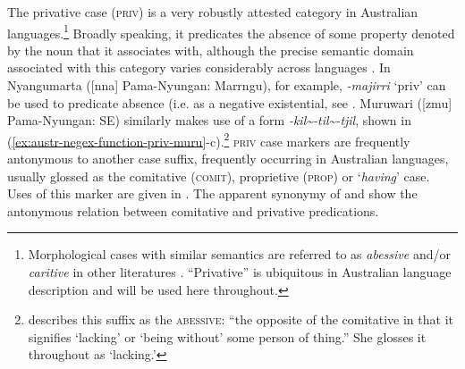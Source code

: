 \documentclass[output=paper]{langsci/langscibook}
\begin{document}
The privative case (\textsc{priv}) is a very robustly attested category in
Australian languages.\footnote{Morphological cases with similar
semantics are referred to as \textit{abessive} and\slash or \textit{caritive}
in other literatures \citep[e.g. for Uralic
in][]{Hamari2011-austr,Hamari2015,Tamm2015}. ``Privative'' is ubiquitous in
Australian language description and will be used here throughout.}
Broadly speaking, it predicates the absence of some property denoted by
the noun that it associates with, although the precise semantic domain
associated with this category varies considerably across languages
\citep[cf. arguments for the predicative status of negative
existential markers in ][139]{Veselinova2013}. In Nyangumarta
([nna] Pama-Nyungan: Marrngu), for example, \textit{-majirri}
`priv' can be used to predicate absence (i.e. as a
    negative existential, see . Muruwari ([zmu]
Pama-Nyungan: SE) similarly makes use of a form
\textit{-kil\textasciitilde-til\textasciitilde-tjil}, shown in
    (\ref{ex:austr-negex-function-priv-muru}-c).\footnote{\citet[77]{Oates1988} describes this suffix as
the \textsc{abessive}: ``the opposite of the comitative in that it
signifies `lacking' or `being without' some person of thing.'' She glosses it throughout as `lacking.'}
\textsc{priv} case markers are frequently antonymous to another case
suffix, frequently occurring in Australian languages, usually glossed
as the
comitative (\textsc{comit}), proprietive (\textsc{prop}) or `\textit{having}'
case. Uses of this marker are given in
. The apparent synonymy of
 and
 show the antonymous relation between comitative and privative predications.
%
\end{document}

